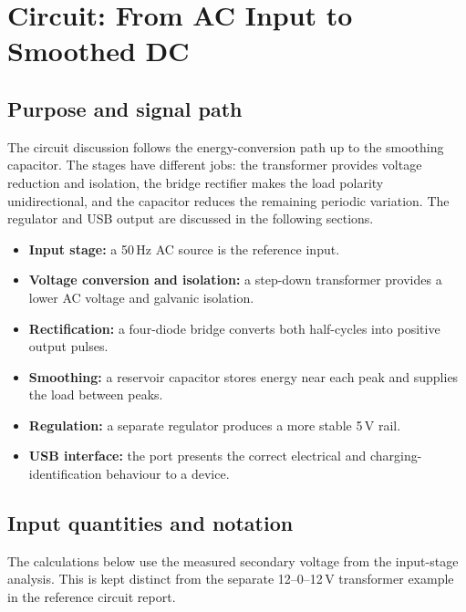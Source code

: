 \documentclass[journal,12pt,twocolumn]{IEEEtran}
\begin{document}

\onecolumn
\section{Circuit: From AC Input to Smoothed DC}

\subsection*{Purpose and signal path}
The circuit discussion follows the energy-conversion path up to the
smoothing capacitor. The stages have different jobs: the transformer
provides voltage reduction and isolation, the bridge rectifier makes
the load polarity unidirectional, and the capacitor reduces the
remaining periodic variation. The regulator and USB output are
discussed in the following sections.

\begin{itemize}[leftmargin=1.5em]
    \item \textbf{Input stage:} a 50\,Hz AC source is the reference input.
    \item \textbf{Voltage conversion and isolation:} a step-down
    transformer provides a lower AC voltage and galvanic isolation.
    \item \textbf{Rectification:} a four-diode bridge converts both
    half-cycles into positive output pulses.
    \item \textbf{Smoothing:} a reservoir capacitor stores energy near
    each peak and supplies the load between peaks.
    \item \textbf{Regulation:} a separate regulator produces a more
    stable 5\,V rail.
    \item \textbf{USB interface:} the port presents the correct
    electrical and charging-identification behaviour to a device.
\end{itemize}

\subsection*{Input quantities and notation}
The calculations below use the measured secondary voltage from the
input-stage analysis. This is kept distinct from the separate
12--0--12\,V transformer example in the reference circuit report.
\end{document}
